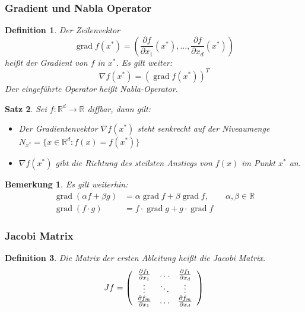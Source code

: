 \documentclass[12pt,a4paper]{report}%
\DeclareMathOperator{\grad}{grad}
\newtheorem{satz}{Satz}[section]
\newtheorem{definition}[satz]{Definition}
\newtheorem{bem}{Bemerkung}[section]
\numberwithin{equation}{section}
\newcommand{\R}{\mathbb{R}} %
\def\dfp#1#2{\frac{\partial #1}{\partial #2}}
\numberwithin{equation}{subsection}
\begin{document}
  \subsubsection{Gradient und Nabla Operator}
  \begin{definition}
    Der Zeilenvektor
    \begin{equation}
      \grad f(x^*) = \left( \dfp{f}{x_1}(x^*), ..., \dfp{f}{x_d}(x^*)\right)
    \end{equation}
    heißt der Gradient von $f$ in $x^*$. Es gilt weiter:
    \begin{equation}
      \nabla f(x^*) = (\grad f(x^*))^T
    \end{equation}
    Der eingeführte Operator heißt Nabla-Operator.
  \end{definition}
  \begin{satz}
    Sei $f:\R^d \rightarrow \R$ diffbar, dann gilt:
    \begin{itemize}
      \item[a) ] Der Gradientenvektor $\nabla f(x^*)$ steht senkrecht auf der Niveaumenge $N_{x^*} = \lbrace x \in \R^d: f(x) = f(x^*)\rbrace$
      \item[b) ] $\nabla f(x^*)$ gibt die Richtung des steilsten Anstiegs von $f(x)$ im Punkt $x^*$ an.
    \end{itemize}
  \end{satz}
  \begin{bem}
    Es gilt weiterhin:
    \begin{align}
      \grad(\alpha f + \beta g) &= \alpha \grad f + \beta \grad f, \qquad \alpha, \beta \in \R    \\  
      \grad (f\cdot g) &= f \cdot \grad g + g \cdot \grad f
    \end{align}
  \end{bem}
  
  \subsubsection{Jacobi Matrix}
  \begin{definition}
    Die Matrix der ersten Ableitung heißt die Jacobi Matrix. 
    \begin{equation}
      Jf = \left(\begin{array}{c c c}
      \dfp{f_1}{x_1} & \dots  & \dfp{f_1}{x_d} \\
      \vdots         & \ddots & \vdots         \\
      \dfp{f_m}{x_1} & \dots  & \dfp{f_m}{x_d} \end{array}\right)
    \end{equation}
  \end{definition}
  
\end{document}
